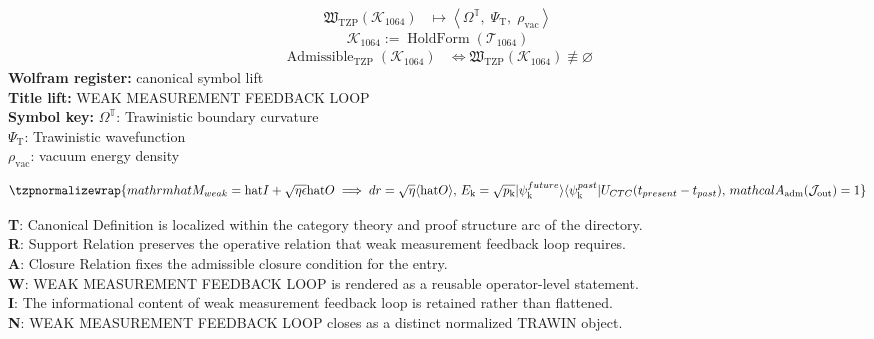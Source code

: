 \noindent
\begin{minipage}[t]{0.48\linewidth}
\begingroup
\small
\[
\begin{aligned}
\mathfrak{W}_{\mathrm{TZP}}\!\left(\mathcal{K}_{1064}\right)
&\longmapsto
\left\langle \Omega^{\mathbb{T}},\; \Psi_{\mathrm{T}},\; \rho_{\mathrm{vac}} \right\rangle
\end{aligned}
\]
\[
\mathcal{K}_{1064}
:=
\operatorname{HoldForm}\!\left(\mathcal{T}_{1064}\right)
\]
\[
\begin{aligned}
\operatorname{Admissible}_{\mathrm{TZP}}\!\left(\mathcal{K}_{1064}\right)
&\Longleftrightarrow
\mathfrak{W}_{\mathrm{TZP}}\!\left(\mathcal{K}_{1064}\right)\not\equiv\varnothing
\end{aligned}
\]
\textbf{Wolfram register:} canonical symbol lift\\
\textbf{Title lift:} WEAK MEASUREMENT FEEDBACK LOOP\\
\textbf{Symbol key:} \(\Omega^{\mathbb{T}}\): Trawinistic boundary curvature\\ \(\Psi_{\mathrm{T}}\): Trawinistic wavefunction\\ \(\rho_{\mathrm{vac}}\): vacuum energy density
\par
\endgroup
\end{minipage}\hfill
\begin{minipage}[t]{0.48\linewidth}
\[
\tzpnormalizewrap{mathrm{hat}{M}_{weak} = \mathrm{hat}{I} + \sqrt{\eta\epsilon}\mathrm{hat}{O} \implies dr = \sqrt{\eta}\langle\mathrm{hat}{O}\rangle,\,E_{\mathrm{k}} = \sqrt{p_{\mathrm{k}}} \lvert \psi_{\mathrm{k}}^{future} \rangle \langle \psi_{\mathrm{k}}^{past}| U_{CTC}(t_{present} - t_{past}),\,mathcal{A}_{\mathrm{adm}}\!\left(\mathcal{J}_{\mathrm{out}}\right)=1}
\]

\small
\textbf{T}: Canonical Definition is localized within the category theory and proof structure arc of the directory.\\
\textbf{R}: Support Relation preserves the operative relation that weak measurement feedback loop requires.\\
\textbf{A}: Closure Relation fixes the admissible closure condition for the entry.\\
\textbf{W}: WEAK MEASUREMENT FEEDBACK LOOP is rendered as a reusable operator-level statement.\\
\textbf{I}: The informational content of weak measurement feedback loop is retained rather than flattened.\\
\textbf{N}: WEAK MEASUREMENT FEEDBACK LOOP closes as a distinct normalized TRAWIN object.
\normalsize
\end{minipage}

